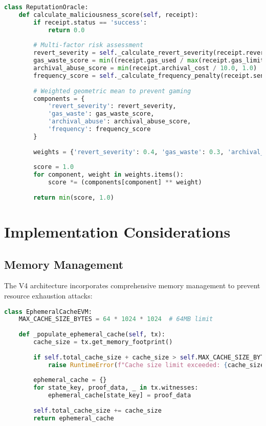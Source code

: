 \documentclass{article}
\begin{document}
\begin{lstlisting}[language=Python,caption={Sybil-Resistant Reputation System},label={lst:reputation}]
class ReputationOracle:
    def calculate_maliciousness_score(self, receipt):
        if receipt.status == 'success':
            return 0.0
        
        # Multi-factor risk assessment
        revert_severity = self._calculate_revert_severity(receipt.revert_reason)
        gas_waste_score = min((receipt.gas_used / max(receipt.gas_limit, 1)) ** 2, 1.0)
        archival_abuse_score = min(receipt.archival_cost / 10.0, 1.0)
        frequency_score = self._calculate_frequency_penalty(receipt.sender_address, receipt.timestamp)
        
        # Weighted geometric mean to prevent gaming
        components = {
            'revert_severity': revert_severity,
            'gas_waste': gas_waste_score,
            'archival_abuse': archival_abuse_score,
            'frequency': frequency_score
        }
        
        weights = {'revert_severity': 0.4, 'gas_waste': 0.3, 'archival_abuse': 0.2, 'frequency': 0.1}
        
        score = 1.0
        for component, weight in weights.items():
            score *= (components[component] ** weight)
        
        return min(score, 1.0)
\end{lstlisting}

\section{Implementation Considerations}

\subsection{Memory Management}

The V4 architecture incorporates comprehensive memory management to prevent resource exhaustion attacks:

\begin{lstlisting}[language=Python,caption={Memory-Safe Cache Management},label={lst:memory}]
class EphemeralCacheEVM:
    MAX_CACHE_SIZE_BYTES = 64 * 1024 * 1024  # 64MB limit
    
    def _populate_ephemeral_cache(self, tx):
        cache_size = tx.get_memory_footprint()
        
        if self.total_cache_size + cache_size > self.MAX_CACHE_SIZE_BYTES:
            raise RuntimeError(f"Cache size limit exceeded: {cache_size} bytes")
        
        ephemeral_cache = {}
        for state_key, proof_data, _ in tx.witnesses:
            ephemeral_cache[state_key] = proof_data
        
        self.total_cache_size += cache_size
        return ephemeral_cache
\end{lstlisting}
\end{document}
